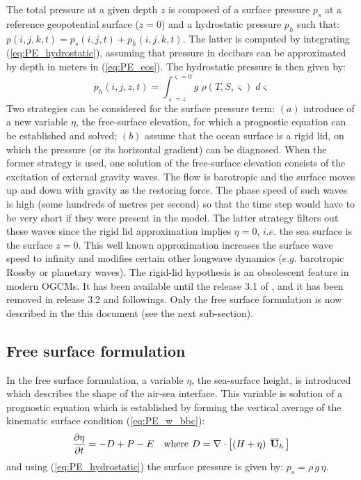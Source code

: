\documentclass[../main/NEMO_manual]{subfiles}
\begin{document}
The total pressure at a given depth $z$ is composed of a surface pressure $p_s$ at
a reference geopotential surface ($z=0$) and a hydrostatic pressure $p_h$ such that:
$p(i,j,k,t)=p_s(i,j,t)+p_h(i,j,k,t)$.
The latter is computed by integrating (\autoref{eq:PE_hydrostatic}),
assuming that pressure in decibars can be approximated by depth in meters in (\autoref{eq:PE_eos}).
The hydrostatic pressure is then given by:
\[
  p_h \left( {i,j,z,t} \right)
  = \int_{\varsigma =z}^{\varsigma =0} {g\;\rho \left( {T,S,\varsigma} \right)\;d\varsigma }
\]
Two strategies can be considered for the surface pressure term:
$(a)$ introduce of a  new variable $\eta$, the free-surface elevation,
for which a prognostic equation can be established and solved;
$(b)$ assume that the ocean surface is a rigid lid,
on which the pressure (or its horizontal gradient) can be diagnosed.
When the former strategy is used, one solution of the free-surface elevation consists of
the excitation of external gravity waves.
The flow is barotropic and the surface moves up and down with gravity as the restoring force.
The phase speed of such waves is high (some hundreds of metres per second) so that
the time step would have to be very short if they were present in the model.
The latter strategy filters out these waves since the rigid lid approximation implies $\eta=0$,
$i.e.$ the sea surface is the surface $z=0$.
This well known approximation increases the surface wave speed to infinity and
modifies certain other longwave dynamics ($e.g.$ barotropic Rossby or planetary waves).
The rigid-lid hypothesis is an obsolescent feature in modern OGCMs.
It has been available until the release 3.1 of  \NEMO, and it has been removed in release 3.2 and followings.
Only the free surface formulation is now described in the this document (see the next sub-section).

\subsection{Free surface formulation}
\label{subsec:PE_free_surface}

In the free surface formulation, a variable $\eta$, the sea-surface height,
is introduced which describes the shape of the air-sea interface.
This variable is solution of a prognostic equation which is established by forming the vertical average of
the kinematic surface condition (\autoref{eq:PE_w_bbc}):
\begin{equation}
  \label{eq:PE_ssh}
  \frac{\partial \eta }{\partial t}=-D+P-E
  \quad \text{where} \
  D=\nabla \cdot \left[ {\left( {H+\eta } \right) \; {\rm{\bf \overline{U}}}_h \,} \right]
\end{equation}
and using (\autoref{eq:PE_hydrostatic}) the surface pressure is given by: $p_s = \rho \, g \, \eta$.
\end{document}
